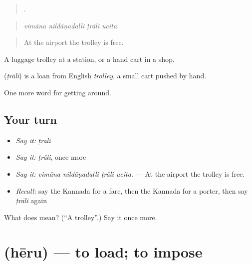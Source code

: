 \begin{quote}
   .
\end{quote}

\begin{quote}
\emph{vimāna nildāṇadalli ṭrāli ucita.}
\end{quote}

\begin{quote}
At the airport the trolley is free.
\end{quote}

A luggage trolley at a station, or a hand cart in a shop.

\begin{cousinweb}
\textbf{} (\emph{ṭrāli}) is a loan from English \emph{trolley}, a small cart pushed by hand.
\end{cousinweb}

\begin{grammarlens}[title={What you've built}]
One more word for getting around.
\end{grammarlens}

\subsection*{Your turn}
\begin{itemize}
\raggedright
  \item \emph{Say it:} \emph{ṭrāli}
  \item \emph{Say it:} \emph{ṭrāli}, once more
  \item \emph{Say it:} \emph{vimāna nildāṇadalli ṭrāli ucita.} — At the airport the trolley is free.
  \item \emph{Recall:} say the Kannada for a fare, then the Kannada for a porter, then say \emph{ṭrāli} again
\end{itemize}

\begin{tcolorbox}[breakable,colback=teal!4,colframe=teal!35!black,title={Before you move on}]
What does  mean? (\textquotedblleft{}A trolley\textquotedblright{}.) Say it once more.
\end{tcolorbox}
\section[\texorpdfstring{\kn{ಹೇರು} (hēru)}{ಹೇರು (hēru)}]{ (hēru) — to load; to impose}

\label{lesson:KA-C436-heru}




